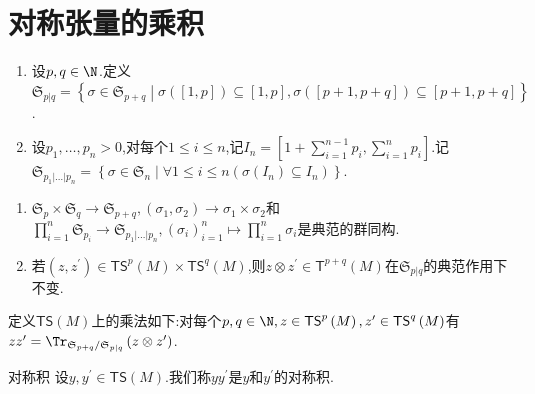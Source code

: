 \section{对称张量的乘积}

\begin{definition}{}{}
	\begin{enumerate}
		\item 设$p,q\in\N$.定义$\mathfrak{S}_{p|q}=\left\{\sigma\in\mathfrak{S}_{p+q}\middle|\sigma\left(\left[1,p\right]\right)\subseteq\left[1,p\right],\sigma\left(\left[p+1,p+q\right]\right)\subseteq\left[p+1,p+q\right]\right\}$.
		\item 设$p_{1},\ldots,p_{n}>0$,对每个$1\leq i\leq n$,记$I_{n}=\left[1+\sum\limits_{i=1}^{n-1}p_{i},\sum\limits_{i=1}^{n}p_{i}\right]$.记$\mathfrak{S}_{p_{1}|\ldots|p_{n}}=\left\{\sigma\in\mathfrak{S}_{n}\middle|\forall 1\leq i\leq n\left(\sigma\left(I_{n}\right)\subseteq I_{n}\right)\right\}$.
	\end{enumerate}
\end{definition}

\begin{remark}{}{}
	\begin{enumerate}
		\item $\mathfrak{S}_{p}\times\mathfrak{S}_{q}\to\mathfrak{S}_{p+q},\left(\sigma_{1},\sigma_{2}\right)\to\sigma_{1}\times\sigma_{2}$和$\prod\limits_{i=1}^{n}\mathfrak{S}_{p_{i}}\to\mathfrak{S}_{p_{1}|\ldots|p_{n}},\left(\sigma_{i}\right)_{i=1}^{n}\mapsto\prod\limits_{i=1}^{n}\sigma_{i}$是典范的群同构.
		\item 若$\left(z,z^{\prime}\right)\in\mathsf{TS}^{p}\left(M\right)\times\mathsf{TS}^{q}\left(M\right)$,则$z\otimes z^{\prime}\in\mathsf{T}^{p+q}\left(M\right)$在$\mathfrak{S}_{p|q}$的典范作用下不变.
	\end{enumerate}
\end{remark}

\begin{definition}{}{}
	定义$\mathsf{TS}\left(M\right)$上的乘法如下:对每个$p,q\in\N,z\in\mathsf{TS}^{p}\left(M\right),z^{\prime}\in\mathsf{TS}^{q}\left(M\right)$有$zz^{\prime}=\Tr_{\mathfrak{S}_{p+q}/\mathfrak{S}_{p|q}}\left(z\otimes z^{\prime}\right)$.
\end{definition}

\begin{definition}{对称积}{}
	设$y,y^{\prime}\in\mathsf{TS}\left(M\right)$.我们称$yy^{\prime}$是$y$和$y^{\prime}$的对称积.
\end{definition}

